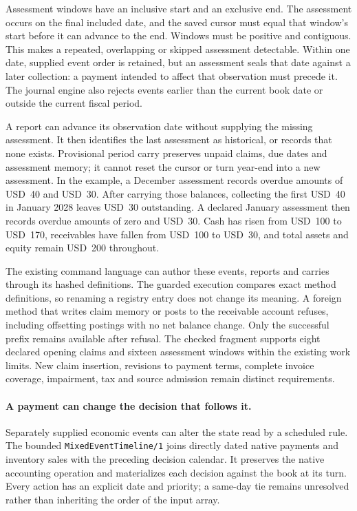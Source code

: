 Assessment windows have an inclusive start and an exclusive end. The assessment
occurs on the final included date, and the saved cursor must equal that window's
start before it can advance to the end. Windows must be positive and contiguous.
This makes a repeated, overlapping or skipped assessment detectable. Within one
date, supplied event order is retained, but an assessment seals that date against
a later collection: a payment intended to affect that observation must precede
it. The journal engine also rejects events earlier than the current book date
or outside the current fiscal period.

A report can advance its observation date without supplying the missing
assessment. It then identifies the last assessment as historical, or records
that none exists. Provisional period carry preserves unpaid claims, due dates
and assessment memory; it cannot reset the cursor or turn year-end into a new
assessment. In the example, a December assessment records overdue amounts of
USD~40 and USD~30. After carrying those balances, collecting the first USD~40
in January 2028 leaves USD~30 outstanding. A declared January assessment then
records overdue amounts of zero and USD~30. Cash has risen from USD~100 to
USD~170, receivables have fallen from USD~100 to USD~30, and total assets and
equity remain USD~200 throughout.

The existing command language can author these events, reports and carries
through its hashed definitions. The guarded execution compares exact method
definitions, so renaming a registry entry does not change its meaning. A foreign
method that writes claim memory or posts to the receivable account refuses,
including offsetting postings with no net balance change. Only the successful
prefix remains available after refusal. The checked fragment supports eight
declared opening claims and sixteen assessment windows within the existing work
limits. New claim insertion, revisions to payment terms, complete invoice
coverage, impairment, tax and source admission remain distinct requirements.


\paragraph{A payment can change the decision that follows it.}
Separately supplied economic events can alter the state read by a scheduled
rule. The bounded \texttt{MixedEventTimeline/1} joins directly dated native
payments and inventory sales with the preceding decision calendar. It preserves
the native accounting operation and materializes each decision against the book
at its turn. Every action has an explicit date and priority; a same-day tie
remains unresolved rather than inheriting the order of the input array.

